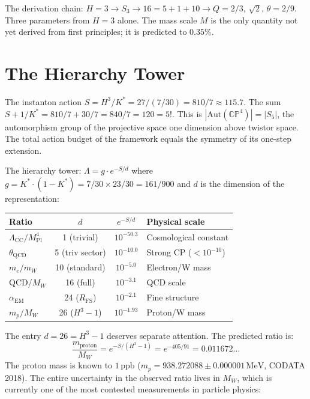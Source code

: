 \documentclass[11pt,a4paper]{article}
\theoremstyle{definition}
\theoremstyle{remark}
\newcommand{\CP}{\mathbb{CP}}
\begin{document}
The derivation chain: $H=3 \to S_3 \to 16 = 5 + 1 + 10 \to Q = 2/3$, $\sqrt{2}$, $\theta = 2/9$. Three parameters from $H = 3$ alone. The mass scale $M$ is the only quantity not yet derived from first principles; it is predicted to $0.35\%$.


\section{The Hierarchy Tower}\label{sec:hierarchy}

The instanton action $S = H^3/K^* = 27/(7/30) = 810/7 \approx 115.7$. The sum $S + 1/K^* = 810/7 + 30/7 = 840/7 = 120 = 5!$. This is $|\mathrm{Aut}(\CP^4)| = |S_5|$, the automorphism group of the projective space one dimension above twistor space. The total action budget of the framework equals the symmetry of its one-step extension.

The hierarchy tower: $\Lambda = g \cdot e^{-S/d}$ where $g = K^* \cdot (1-K^*) = 7/30 \times 23/30 = 161/900$ and $d$ is the dimension of the representation:

\begin{center}
\begin{tabular}{lccl}
\toprule
Ratio & $d$ & $e^{-S/d}$ & Physical scale \\
\midrule
$\Lambda_{\mathrm{CC}}/M_{\mathrm{Pl}}^4$ & 1 (trivial) & $10^{-50.3}$ & Cosmological constant \\
$\theta_{\mathrm{QCD}}$ & 5 (triv sector) & $10^{-10.0}$ & Strong CP ($< 10^{-10}$) \\
$m_e/m_W$ & 10 (standard) & $10^{-5.0}$ & Electron/W mass \\
QCD/$M_W$ & 16 (full) & $10^{-3.1}$ & QCD scale \\
$\alpha_{\mathrm{EM}}$ & 24 ($R_{\mathrm{FS}}$) & $10^{-2.1}$ & Fine structure \\
$m_p/M_W$ & 26 ($H^3-1$) & $10^{-1.93}$ & Proton/W mass \\
\bottomrule
\end{tabular}
\end{center}

The entry $d=26=H^3-1$ deserves separate attention. The predicted ratio is:
\begin{equation}\label{eq:protonW}
\frac{m_{\mathrm{proton}}}{M_W}=e^{-S/(H^3-1)}=e^{-405/91}=0.011672\ldots
\end{equation}
The proton mass is known to $1\,\mathrm{ppb}$ ($m_p = 938.272088 \pm 0.000001\,\mathrm{MeV}$, CODATA 2018). The entire uncertainty in the observed ratio lives in $M_W$, which is currently one of the most contested measurements in particle physics:
\end{document}
